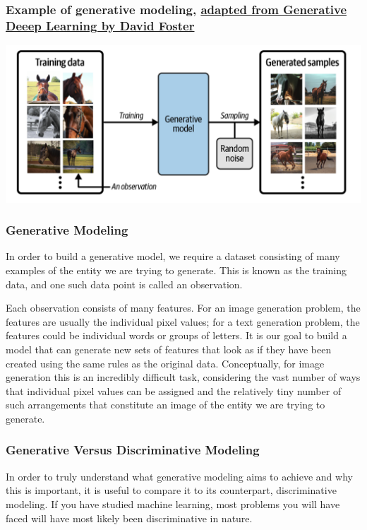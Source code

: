 \documentclass{beamer}
\begin{document}
\begin{frame}
\frametitle{Example of generative modeling, \href{{https://www.oreilly.com/library/view/generative-deep-learning/9781098134174/ch01.html}}{adapted from Generative Deeep Learning by David Foster}}

\vspace{6mm}

\centerline{\includegraphics[width=1.0\linewidth]{figures/generativelearning.png}}

\vspace{6mm}
\end{frame}

\begin{frame}
\frametitle{Generative Modeling}

In order to build a generative model, we require a dataset consisting
of many examples of the entity we are trying to generate. This is
known as the training data, and one such data point is called an
observation.

Each observation consists of many features. For an image generation
problem, the features are usually the individual pixel values; for a
text generation problem, the features could be individual words or
groups of letters. It is our goal to build a model that can generate
new sets of features that look as if they have been created using the
same rules as the original data. Conceptually, for image generation
this is an incredibly difficult task, considering the vast number of
ways that individual pixel values can be assigned and the relatively
tiny number of such arrangements that constitute an image of the
entity we are trying to generate.
\end{frame}

\begin{frame}
\frametitle{Generative Versus Discriminative Modeling}

In order to truly understand what generative modeling aims to achieve
and why this is important, it is useful to compare it to its
counterpart, discriminative modeling. If you have studied machine
learning, most problems you will have faced will have most likely been
discriminative in nature.
\end{frame}
\end{document}
